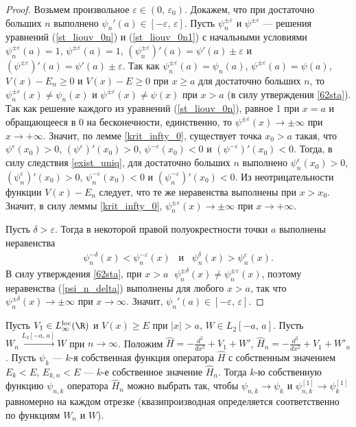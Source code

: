 \documentclass[a4paper
]{article}
\begin{document}
\begin{proof}
Возьмем произвольное $\varepsilon\in (0, \, \varepsilon_0)$.
Докажем, что при достаточно больших $n$ выполнено $\psi_n'(a)
\in [-\varepsilon , \, \varepsilon]$. Пусть $\psi^{\pm \varepsilon}_n$
и $\psi^{\pm \varepsilon}$ --- решения уравнений (\ref{st_liouv_0n})
и (\ref{st_liouv_0n1}) с начальными условиями
$\psi^{\pm \varepsilon}_n(a)=1$, $\psi^{\pm \varepsilon}(a)=1$,
$(\psi_n^{\pm \varepsilon})'(a)=\psi'(a)\pm \varepsilon$ и $(\psi^{\pm
\varepsilon})'(a)=\psi'(a)\pm \varepsilon$. Так как $\psi^{\pm
\varepsilon}_n(a)=\psi_n(a)$, $\psi^{\pm \varepsilon}(a)=\psi(a)$,
$V(x)-E_n\ge 0$ и $V(x)-E\ge 0$ при $x\ge a$ для достаточно больших
$n$, то $\psi_n^{\pm \varepsilon}(x)\ne \psi_n(x)$ и $\psi^{\pm
\varepsilon}(x)\ne \psi(x)$ при $x>a$ (в силу утверждения \ref{62sta}).
Так как решение каждого из уравнений (\ref{st_liouv_0n}), равное 1
при $x=a$ и обращающееся в 0 на бесконечности, единственно, то
$\psi^{\pm \varepsilon}(x)\rightarrow \pm \infty$ при $x\rightarrow
+\infty$. Значит, по лемме \ref{krit_infty_0}, существует точка
$x_0>a$ такая, что $\psi^\varepsilon(x_0)>0$, $(\psi^\varepsilon)'
(x_0)>0$, $\psi^{-\varepsilon}(x_0)<0$ и $(\psi^{-\varepsilon})'(x_0)
<0$. Тогда, в силу следствия \ref{exist_uniq}, для достаточно
больших $n$ выполнено $\psi^\varepsilon_n(x_0)>0$, $(\psi_n^\varepsilon)'
(x_0)>0$, $\psi^{-\varepsilon}_n(x_0)<0$ и $(\psi_n^{-\varepsilon})'(x_0)
<0$. Из неотрицательности функции $V(x)-E_n$ следует, что те же
неравенства выполнены при $x>x_0$. Значит, в силу леммы
\ref{krit_infty_0}, $\psi_n^{\pm \varepsilon}(x)\rightarrow \pm
\infty$ при $x\rightarrow +\infty$. \par
Пусть $\delta>\varepsilon$. Тогда
в некоторой правой полуокрестности точки $a$ выполнены неравенства
\begin{align}
\label{psi_n_delta}
\psi_n^{-\delta}(x)<\psi_n^{-\varepsilon}(x) \;\;\; \text{и} \;\;\;
\psi_n^\delta(x)>\psi_n^\varepsilon(x).
\end{align}
В силу утверждения \ref{62sta}, при $x>a\;$ $\psi_n^{\pm \delta}(x)\ne
\psi_n^{\pm \varepsilon}(x)$, поэтому неравенства (\ref{psi_n_delta})
выполнены для любого $x>a$, так что $\psi_n^{\pm \delta}(x)\rightarrow
\pm \infty$ при $x\rightarrow \infty$. Значит, $\psi_n'(a)\in [-\varepsilon,
\, \varepsilon]$.
\end{proof}
\begin{Sta}
\label{cont_wn}
Пусть $V_1\in L_\infty^{{\rm loc}}(\R)$ и $V(x)\ge E$ при $|x|>a$,
$W\in L_2[-a, \, a]$. Пусть $W_n\stackrel{L_2[-a, \, a]}{\rightarrow}W$
при $n\rightarrow \infty$. Положим $\hat H=-\frac{d^2}{dx^2}+V_1+W'$,
$\hat H_n=-\frac{d^2}{dx^2}+V_1+W'_n$. Пусть $\psi_k$ --- $k$-я
собственная функция оператора $\hat H$ с собственным значением $E_k<E$,
$E_{k,n}<E$ --- $k$-е собственное значение $\hat H_n$. Тогда $k$-ю
собственную функцию $\psi_{n,k}$ оператора $\hat H_n$ можно выбрать так,
чтобы $\psi_{n,k}\rightarrow \psi_k$ и $\psi^{[1]}_{n,k}\rightarrow
\psi^{[1]}_k$ равномерно на каждом отрезке (квазипроизводная определяется
соответственно по функциям $W_n$ и $W$).
\end{Sta}
\end{document}
